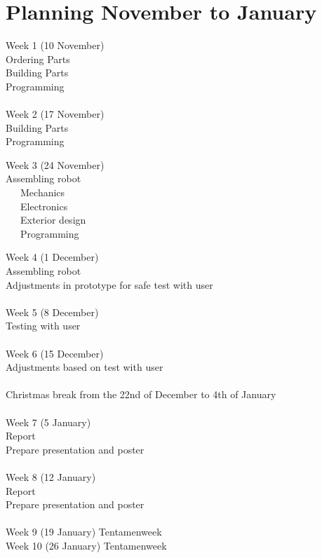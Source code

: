\documentclass[11pt,twoside,a4paper]{report}
\begin{document}
\chapter{Planning November to January}
Week 1 (10 November)\\
Ordering Parts\\
Building Parts\\
Programming\\
\\
Week 2 (17 November)\\
Building Parts\\
Programming
\begin{tabbing}
Week 3 (24 November)\\
Assembling robot\\
~~~Mechanics\\
~~~Electronics\\
~~~Exterior design\\
~~~Programming
\end{tabbing}
Week 4 (1 December)\\
Assembling robot\\
Adjustments in prototype for safe test with user\\
\\
Week 5 (8 December)\\
Testing with user\\
\\
Week 6 (15 December)\\
Adjustments based on test with user\\
\\
Christmas break from the 22nd of December to 4th of January\\
\\
Week 7 (5 January)\\
Report\\
Prepare presentation and poster\\
\\
Week 8 (12 January)\\
Report\\
Prepare presentation and poster\\
\\
Week 9 (19 January) Tentamenweek\\
Week 10 (26 January) Tentamenweek
\end{document}
